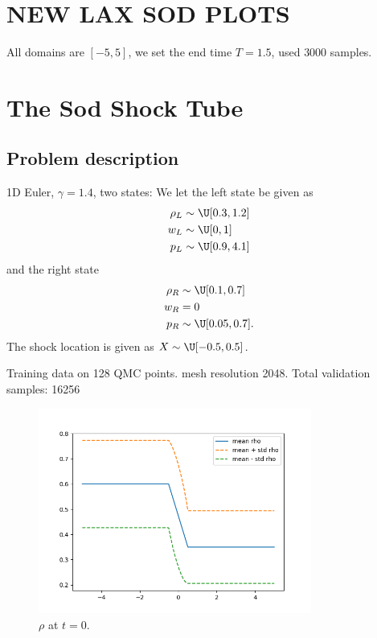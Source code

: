 \section{NEW LAX SOD PLOTS}
All domains are $[-5, 5]$, we set the end time $T=1.5$, used $3000$ samples.
\section{The Sod Shock Tube}
\subsection{Problem description}

1D Euler, $\gamma=1.4$, two states: 
We let the left state be given as
\begin{align*}
\rho_L&\sim \U[0.3, 1.2]\\
w_L&\sim \U[0, 1]\\
p_L&\sim\U[0.9, 4.1]
\end{align*}
and the right state
\begin{align*}
\rho_R&\sim \U[0.1, 0.7]\\
w_R&=0\\
p_R&\sim \U[0.05, 0.7].
\end{align*}
The shock location is given as $X\sim \U[-0.5, 0.5]$. 

Training data on 128 QMC points. mesh resolution 2048. Total validation samples: 16256



\begin{figure}
	\includegraphics[width=0.8\textwidth]{img/rho_mean_std_0}
	
	\caption{$\rho$ at $t=0$.}
\end{figure}

